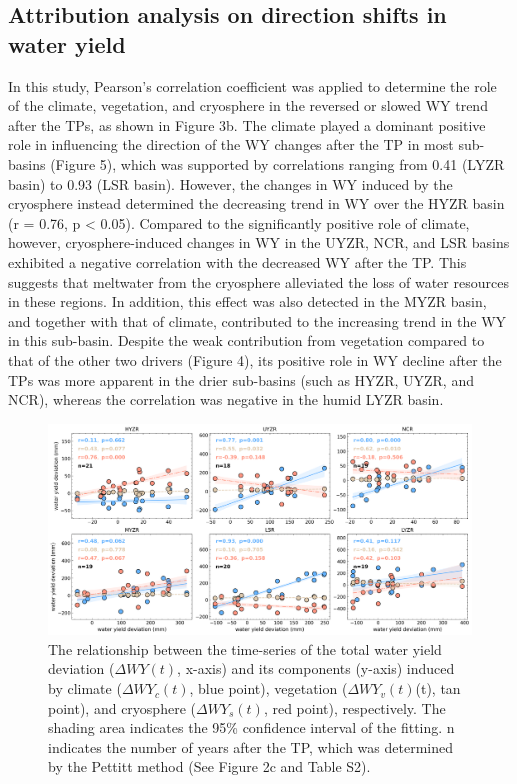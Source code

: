 \documentclass[hess, manuscript]{copernicus}
\begin{document}
\subsection{Attribution analysis on direction shifts in water yield}
In this study, Pearson’s correlation coefficient was applied to determine the role of the climate, vegetation, and cryosphere in the reversed or slowed WY trend after the TPs, as shown in Figure 3b. The climate played a dominant positive role in influencing the direction of the WY changes after the TP in most sub-basins (Figure 5), which was supported by correlations ranging from 0.41 (LYZR basin) to 0.93 (LSR basin). However, the changes in WY induced by the cryosphere instead determined the decreasing trend in WY over the HYZR basin (r = 0.76, p < 0.05). Compared to the significantly positive role of climate, however, cryosphere-induced changes in WY in the UYZR, NCR, and LSR basins exhibited a negative correlation with the decreased WY after the TP. This suggests that meltwater from the cryosphere alleviated the loss of water resources in these regions. In addition, this effect was also detected in the MYZR basin, and together with that of climate, contributed to the increasing trend in the WY in this sub-basin. Despite the weak contribution from vegetation compared to that of the other two drivers (Figure 4), its positive role in WY decline after the TPs was more apparent in the drier sub-basins (such as HYZR, UYZR, and NCR), whereas the correlation was negative in the humid LYZR basin.

\begin{figure}[t]
\includegraphics[width=12cm]{01-figures/Fig.5.png}
\caption{The relationship between the time-series of the total water yield deviation ($\Delta WY(t)$, x-axis) and its components (y-axis) induced
by climate ($\Delta WY_c(t)$, blue point), vegetation ($\Delta WY_v(t)$(t), tan point), and cryosphere ($\Delta WY_s(t)$, red point), respectively. The shading area
indicates the 95\% confidence interval of the fitting. n indicates the number of years after the TP, which was determined by the Pettitt
method (See Figure 2c and Table S2).}
\label{fig:direction-attribution}
\end{figure}
\end{document}
